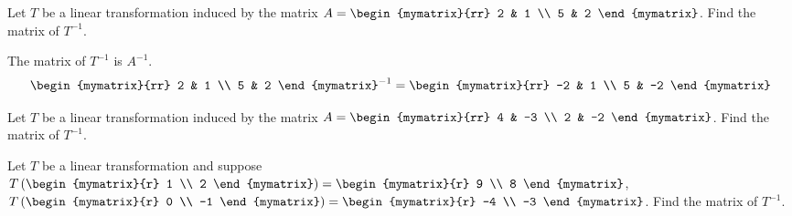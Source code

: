 \begin{enumialphparenastyle}
\begin{ex} Let $T$ be a linear transformation induced by the matrix $A = \begin{mymatrix}{rr}
2 & 1 \\
5 & 2 
\end{mymatrix}$. Find the matrix of $T^{-1}$.
\begin{sol}
The matrix of $T^{-1}$ is $A^{-1}$.
\[
\begin{mymatrix}{rr}
2 & 1 \\
5 & 2 
\end{mymatrix} ^{-1} = 
\begin{mymatrix}{rr}
-2 & 1 \\
5 & -2
\end{mymatrix}
\]
\end{sol}
\end{ex}

\begin{ex} Let $T$ be a linear transformation induced by the matrix $A = \begin{mymatrix}{rr}
4 & -3 \\
2 & -2 
\end{mymatrix}$. Find the matrix of $T^{-1}$. 
\end{ex}

\begin{ex} Let $T$ be a linear transformation and suppose $T \tup{\begin{mymatrix}{r}
1 \\
2
\end{mymatrix} } = \begin{mymatrix}{r}
9 \\
8
\end{mymatrix}$, $T \tup{\begin{mymatrix}{r}
0 \\
-1
\end{mymatrix} } = \begin{mymatrix}{r}
-4 \\
-3
\end{mymatrix}$. 
Find the matrix of $T^{-1}$. 
\end{ex}

\end{enumialphparenastyle}